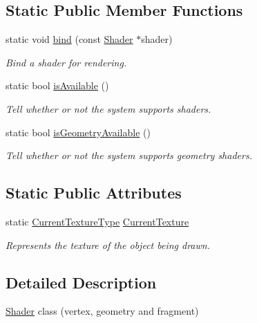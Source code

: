 \subsection*{Static Public Member Functions}
\begin{DoxyCompactItemize}
\item 
static void \hyperlink{classsf_1_1_shader_a09778f78afcbeb854d608c8dacd8ea30}{bind} (const \hyperlink{classsf_1_1_shader}{Shader} $\ast$shader)
\begin{DoxyCompactList}\small\item\em Bind a shader for rendering. \end{DoxyCompactList}\item 
static bool \hyperlink{classsf_1_1_shader_ad22474690bafe4a305c1b9826b1bd86a}{is\+Available} ()
\begin{DoxyCompactList}\small\item\em Tell whether or not the system supports shaders. \end{DoxyCompactList}\item 
static bool \hyperlink{classsf_1_1_shader_a45db14baf1bbc688577f81813b1fce96}{is\+Geometry\+Available} ()
\begin{DoxyCompactList}\small\item\em Tell whether or not the system supports geometry shaders. \end{DoxyCompactList}\end{DoxyCompactItemize}
\subsection*{Static Public Attributes}
\begin{DoxyCompactItemize}
\item 
static \hyperlink{structsf_1_1_shader_1_1_current_texture_type}{Current\+Texture\+Type} \hyperlink{classsf_1_1_shader_ac84c7953eec2e19358ea6e2cc5385b8d}{Current\+Texture}
\begin{DoxyCompactList}\small\item\em Represents the texture of the object being drawn. \end{DoxyCompactList}\end{DoxyCompactItemize}


\subsection{Detailed Description}
\hyperlink{classsf_1_1_shader}{Shader} class (vertex, geometry and fragment) 

